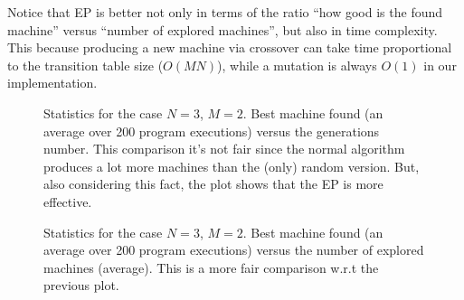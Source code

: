 Notice that EP is better not only in terms of the ratio ``how good is the found machine'' versus ``number of explored machines'', but also in time complexity. This because producing a new machine via crossover can take time proportional to the transition table size (\ie $O(MN)$), while a mutation is always $O(1)$ in our implementation.

\begin{figure}[t]
\centering
{}
\caption[]{Statistics for the case $N=3$, $M=2$. Best machine found (an average over 200 program executions) versus the generations number. This comparison it's not fair since the normal algorithm produces a lot more machines than the (only) random version. But, also considering this fact, the plot shows that the EP is more effective.}
\label{plot32}
\end{figure}


\begin{figure}[b]
\centering
{}
\caption[]{Statistics for the case $N=3$, $M=2$. Best machine found (an average over 200 program executions) versus the number of explored machines (average). This is a more fair comparison w.r.t the previous plot.}
\label{plot32good}
\end{figure}




